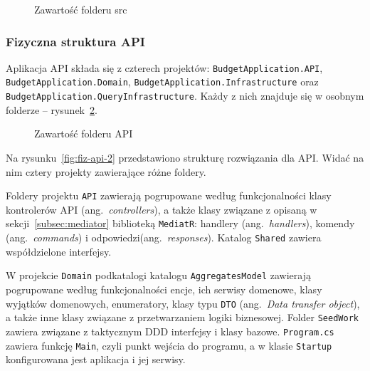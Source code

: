 \begin{figure}[t]
	\centering
	\caption{Zawartość folderu src}
	\label{fig:fiz-2}
\end{figure}

\subsubsection{Fizyczna struktura API}

Aplikacja API składa się z czterech projektów: \texttt{BudgetApplication.API}, \texttt{BudgetApplication.Domain}, \texttt{BudgetApplication.Infrastructure} oraz \texttt{BudgetApplication.QueryInfrastructure}. Każdy z nich znajduje się w osobnym folderze -- rysunek~\ref{fig:fiz-api-1}.

\begin{figure}[t]
	\centering
	\caption{Zawartość folderu API}
	\label{fig:fiz-api-1}
\end{figure}

Na rysunku~\ref{fig:fiz-api-2} przedstawiono strukturę rozwiązania dla API. Widać na nim cztery projekty zawierające różne foldery. 

Foldery projektu \texttt{API} zawierają pogrupowane według funkcjonalności klasy kontrolerów API (ang.~\emph{controllers}), a także klasy związane z opisaną w sekcji~\ref{subsec:mediator} biblioteką \texttt{MediatR}: handlery (ang.~\emph{handlers}), komendy (ang.~\emph{commands}) i odpowiedzi(ang.~\emph{responses}). Katalog \texttt{Shared} zawiera współdzielone interfejsy. 

W projekcie \texttt{Domain} podkatalogi katalogu \texttt{AggregatesModel} zawierają pogrupowane według funkcjonalności encje, ich serwisy domenowe, klasy wyjątków domenowych, enumeratory, klasy typu \texttt{DTO} (ang.~\emph{Data transfer object}), a także inne klasy związane z przetwarzaniem logiki biznesowej. Folder \texttt{SeedWork} zawiera związane z taktycznym DDD interfejsy i klasy bazowe. \texttt{Program.cs} zawiera funkcję \texttt{Main}, czyli punkt wejścia do programu, a w klasie \texttt{Startup} konfigurowana jest aplikacja i jej serwisy.

